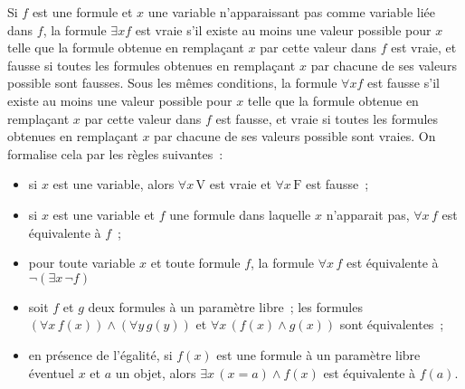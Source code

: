 Si $f$ est une formule et $x$ une variable n'apparaissant pas comme variable liée dans $f$, la formule $\exists x f$ est vraie s'il existe au moins une valeur possible pour $x$ telle que la formule obtenue en remplaçant $x$ par cette valeur dans $f$ est vraie, et fausse si toutes les formules obtenues en remplaçant $x$ par chacune de ses valeurs possible sont fausses. 
Sous les mêmes conditions, la formule $\forall x f$ est fausse s'il existe au moins une valeur possible pour $x$ telle que la formule obtenue en remplaçant $x$ par cette valeur dans $f$ est fausse, et vraie si toutes les formules obtenues en remplaçant $x$ par chacune de ses valeurs possible sont vraies. 
On formalise cela par les règles suivantes : 
\begin{itemize}
    \item si $x$ est une variable, alors $\forall x \, \mathrm{V}$ est vraie et $\forall x \, \mathrm{F}$ est fausse ; 
    \item si $x$ est une variable et $f$ une formule dans laquelle $x$ n'apparait pas, $\forall x \, f$ est équivalente à $f$ ; 
    \item pour toute variable $x$ et toute formule $f$, la formule $\forall x \, f$ est équivalente à $\neg (\exists x \, \neg f)$ 
    \item soit $f$ et $g$ deux formules à un paramètre libre ; les formules $(\forall x \, f(x)) \wedge (\forall y \, g(y))$ et $\forall x \, (f(x) \wedge g(x))$ sont équivalentes ; 
    \item en présence de l'égalité, si $f(x)$ est une formule à un paramètre libre éventuel $x$ et $a$ un objet, alors $\exists x \, (x = a) \wedge f(x)$ est équivalente à $f(a)$.
\end{itemize}


